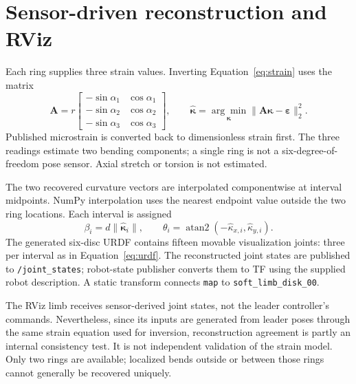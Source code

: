 \documentclass[11pt,letterpaper]{article}
\begin{document}
\section{Sensor-driven reconstruction and RViz}
Each ring supplies three strain values. Inverting Equation~\eqref{eq:strain}
uses the matrix
\begin{equation}
\mathbf{A}=r\begin{bmatrix}
-\sin\alpha_1&\cos\alpha_1\\
-\sin\alpha_2&\cos\alpha_2\\
-\sin\alpha_3&\cos\alpha_3
\end{bmatrix},\qquad
\hat{\boldsymbol{\kappa}}=\underset{\boldsymbol{\kappa}}{\arg\min}
\|\mathbf{A}\boldsymbol{\kappa}-\boldsymbol{\varepsilon}\|_2^2.
\end{equation}
Published microstrain is converted back to dimensionless strain first.
The three readings estimate two bending components; a single ring is not a
six-degree-of-freedom pose sensor. Axial stretch or torsion is not estimated.

The two recovered curvature vectors are interpolated componentwise at interval
midpoints. NumPy interpolation uses the nearest endpoint value outside the
two ring locations. Each interval is assigned
\begin{equation}
\beta_i=d\|\hat{\boldsymbol{\kappa}}_i\|,
\qquad\theta_i=\operatorname{atan2}(-\hat\kappa_{x,i},\hat\kappa_{y,i}).
\end{equation}
The generated six-disc URDF contains fifteen movable visualization joints:
three per interval as in Equation~\eqref{eq:urdf}. The reconstructed joint states
are published to \texttt{/joint\_states}; robot-state publisher converts them
to TF using the supplied robot description. A static transform connects
\texttt{map} to \texttt{soft\_limb\_disk\_00}.

The RViz limb receives sensor-derived joint states, not the leader controller's
commands. Nevertheless, since its inputs are generated from leader poses
through the same strain equation used for inversion, reconstruction agreement
is partly an internal consistency test. It is not independent validation of
the strain model. Only two rings are available; localized bends outside or
between those rings cannot generally be recovered uniquely.
\end{document}
